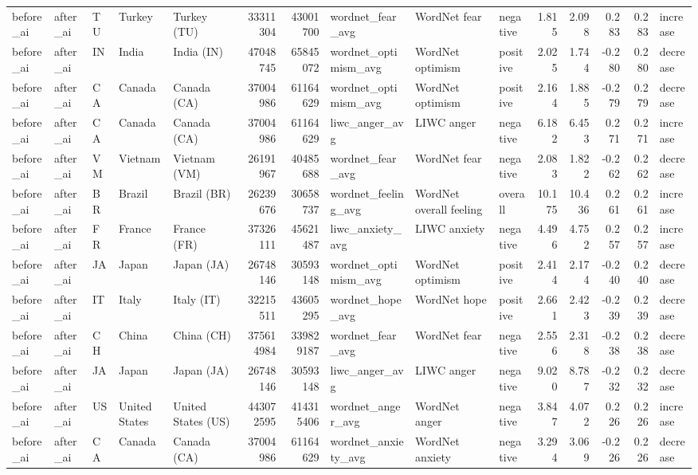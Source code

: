 \begin{tabular}{lllllrrlllrrrrl}
before\_ai & after\_ai & TU & Turkey & Turkey (TU) & 33311304 & 43001700 & wordnet\_fear\_avg & WordNet fear & negative & 1.815 & 2.098 & 0.283 & 0.283 & increase \\
before\_ai & after\_ai & IN & India & India (IN) & 47048745 & 65845072 & wordnet\_optimism\_avg & WordNet optimism & positive & 2.025 & 1.744 & -0.280 & 0.280 & decrease \\
before\_ai & after\_ai & CA & Canada & Canada (CA) & 37004986 & 61164629 & wordnet\_optimism\_avg & WordNet optimism & positive & 2.164 & 1.885 & -0.279 & 0.279 & decrease \\
before\_ai & after\_ai & CA & Canada & Canada (CA) & 37004986 & 61164629 & liwc\_anger\_avg & LIWC anger & negative & 6.182 & 6.453 & 0.271 & 0.271 & increase \\
before\_ai & after\_ai & VM & Vietnam & Vietnam (VM) & 26191967 & 40485688 & wordnet\_fear\_avg & WordNet fear & negative & 2.083 & 1.822 & -0.262 & 0.262 & decrease \\
before\_ai & after\_ai & BR & Brazil & Brazil (BR) & 26239676 & 30658737 & wordnet\_feeling\_avg & WordNet overall feeling & overall & 10.175 & 10.436 & 0.261 & 0.261 & increase \\
before\_ai & after\_ai & FR & France & France (FR) & 37326111 & 45621487 & liwc\_anxiety\_avg & LIWC anxiety & negative & 4.496 & 4.752 & 0.257 & 0.257 & increase \\
before\_ai & after\_ai & JA & Japan & Japan (JA) & 26748146 & 30593148 & wordnet\_optimism\_avg & WordNet optimism & positive & 2.414 & 2.174 & -0.240 & 0.240 & decrease \\
before\_ai & after\_ai & IT & Italy & Italy (IT) & 32215511 & 43605295 & wordnet\_hope\_avg & WordNet hope & positive & 2.661 & 2.423 & -0.239 & 0.239 & decrease \\
before\_ai & after\_ai & CH & China & China (CH) & 375614984 & 339829187 & wordnet\_fear\_avg & WordNet fear & negative & 2.556 & 2.318 & -0.238 & 0.238 & decrease \\
before\_ai & after\_ai & JA & Japan & Japan (JA) & 26748146 & 30593148 & liwc\_anger\_avg & LIWC anger & negative & 9.020 & 8.787 & -0.232 & 0.232 & decrease \\
before\_ai & after\_ai & US & United States & United States (US) & 443072595 & 414315406 & wordnet\_anger\_avg & WordNet anger & negative & 3.847 & 4.072 & 0.226 & 0.226 & increase \\
before\_ai & after\_ai & CA & Canada & Canada (CA) & 37004986 & 61164629 & wordnet\_anxiety\_avg & WordNet anxiety & negative & 3.294 & 3.069 & -0.226 & 0.226 & decrease \\

\end{tabular}
